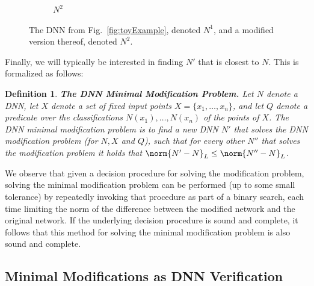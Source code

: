 \documentclass{easychair}
\newtheorem{definition}{Definition}
\begin{document}
\begin{figure}[htp]
\begin{subfigure}{0.5\linewidth}
    \caption{$N^2$}
  \end{subfigure}
  \caption{The DNN from Fig.~\ref{fig:toyExample}, denoted $N^1$, and
    a modified version thereof, denoted $N^2$.}
  \label{fig:toyExampleModified}
\end{figure}

Finally, we will typically be interested in finding $N'$ that is
closest to $N$. This is formalized as follows:
\begin{definition}\textbf{The DNN Minimal Modification Problem.}
  Let $N$ denote a DNN, let $X$ denote a set of fixed input points
  $X=\{x_1, \ldots, x_n\}$, and let $Q$ denote a predicate over the
  classifications $N(x_1),\ldots,N(x_n)$ of the points of $X$. The
  \emph{DNN minimal modification problem} is to find a new DNN $N'$
  that solves the DNN modification problem (for $N, X$ and $Q$), such that for every other
  $N''$ that solves the modification problem it holds that
  $\norm{N'-N}_L\leq \norm{N''-N}_L$.
\end{definition}
We observe that given a decision procedure for solving the
modification problem, solving the minimal modification problem can be
performed (up to some small tolerance) by repeatedly invoking that
procedure as part of a binary search, each time limiting the norm of
the difference between the modified network and the original
network. If the underlying decision procedure is sound and complete,
it follows that this method for solving the minimal modification
problem is also sound and complete.

\subsection{Minimal Modifications as DNN Verification}
\end{document}
